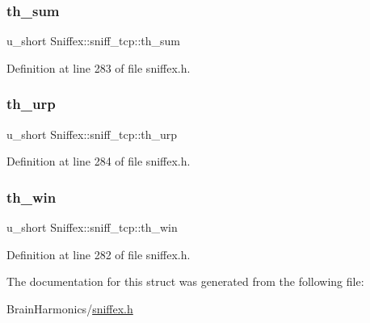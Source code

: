 \subsubsection{\texorpdfstring{th\+\_\+sum}{th\_sum}}
{\footnotesize\ttfamily u\+\_\+short Sniffex\+::sniff\+\_\+tcp\+::th\+\_\+sum}



Definition at line 283 of file sniffex.\+h.

\mbox{\label{struct_sniffex_1_1sniff__tcp_a9f030cb6718b8d828f242d0464560761}} 
\subsubsection{\texorpdfstring{th\+\_\+urp}{th\_urp}}
{\footnotesize\ttfamily u\+\_\+short Sniffex\+::sniff\+\_\+tcp\+::th\+\_\+urp}



Definition at line 284 of file sniffex.\+h.

\mbox{\label{struct_sniffex_1_1sniff__tcp_aa8b7d8b1967e81a255ec9362f681c721}} 
\subsubsection{\texorpdfstring{th\+\_\+win}{th\_win}}
{\footnotesize\ttfamily u\+\_\+short Sniffex\+::sniff\+\_\+tcp\+::th\+\_\+win}



Definition at line 282 of file sniffex.\+h.



The documentation for this struct was generated from the following file\+:\begin{DoxyCompactItemize}
\item 
Brain\+Harmonics/\mbox{\hyperlink{sniffex_8h}{sniffex.\+h}}\end{DoxyCompactItemize}
